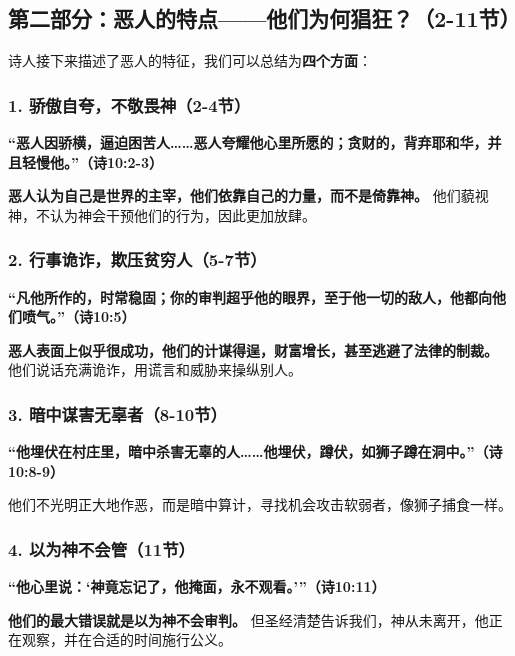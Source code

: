 \documentclass[a4paper, 12pt]{article}
\begin{document}
\subsection*{第二部分：恶人的特点——他们为何猖狂？（2-11节）}

诗人接下来描述了恶人的特征，我们可以总结为\textbf{四个方面}：  

\subsubsection*{1. 骄傲自夸，不敬畏神（2-4节） }
   \textbf{“恶人因骄横，逼迫困苦人……恶人夸耀他心里所愿的；贪财的，背弃耶和华，并且轻慢他。”（诗10:2-3）  }
   
   \vspace{0.2cm}

   \textbf{恶人认为自己是世界的主宰，他们依靠自己的力量，而不是倚靠神。} 他们藐视神，不认为神会干预他们的行为，因此更加放肆。  

\subsubsection*{2. 行事诡诈，欺压贫穷人（5-7节）}
   \textbf{“凡他所作的，时常稳固；你的审判超乎他的眼界，至于他一切的敌人，他都向他们喷气。”（诗10:5）  }
    
    \vspace{0.2cm}
   
   \textbf{恶人表面上似乎很成功，他们的计谋得逞，财富增长，甚至逃避了法律的制裁。} 他们说话充满诡诈，用谎言和威胁来操纵别人。  

\subsubsection*{3. 暗中谋害无辜者（8-10节） }
   \textbf{“他埋伏在村庄里，暗中杀害无辜的人……他埋伏，蹲伏，如狮子蹲在洞中。”（诗10:8-9）}  

   \vspace{0.2cm}

   他们不光明正大地作恶，而是暗中算计，寻找机会攻击软弱者，像狮子捕食一样。  

\subsubsection*{4. 以为神不会管（11节） }
   \textbf{“他心里说：‘神竟忘记了，他掩面，永不观看。’”（诗10:11）  }

   \vspace{0.2cm}

   \textbf{他们的最大错误就是以为神不会审判。} 但圣经清楚告诉我们，神从未离开，他正在观察，并在合适的时间施行公义。  
\end{document}

